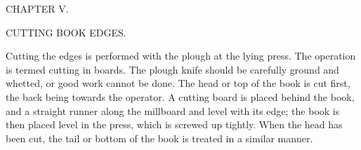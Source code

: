 \documentclass[twoside]{book}
\begin{document}
\pagebreak


\thispagestyle{empty}

\vspace*{\fill}

\begin{center}

\begin{large}CHAPTER V.\end{large}

\begin{small}CUTTING BOOK EDGES.\end{small}

\end{center}

\noindent
Cutting the edges is performed with the plough at
the lying press. The operation is termed cutting in
boards. The plough knife should be carefully ground
and whetted, or good work cannot be done. The
head or top of the book is cut first, the back being
towards the operator. A cutting board is placed
behind the book, and a straight runner along the
millboard and level with its edge; the book is then
placed level in the press, which is screwed up
tightly. When the head has been cut, the tail or
bottom of the book is treated in a similar manner.
\end{document}
